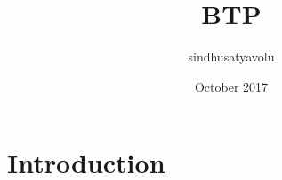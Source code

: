 \documentclass{article}
\title{BTP}
\author{sindhusatyavolu }
\date{October 2017}
\begin{document}
\maketitle

\section{Introduction}
\end{document}
